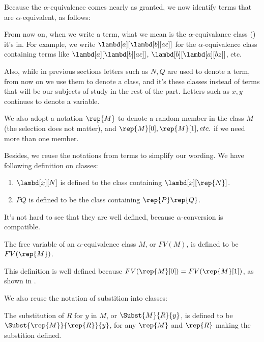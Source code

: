 \documentclass[../../../include/open-logic-section]{subfiles}
\begin{document}

Because the $\alpha$-equivalence comes nearly as granted, we now
identify terms that are $\alpha$-equivalent, as follows:

From now on, when we write a term, what we mean is the
$\alpha$-equivalance class () it's in. For
example, we write $\lambd[a][\lambd[b][a c]]$ for the
$\alpha$-equivalence class containing terms like
$\lambd[a][\lambd[b][a c]]$, $\lambd[b][\lambd[a][b z]]$, etc.

Also, while in previous sections letters such as $N, Q$ are used to
denote a term, from now on we use them to denote a class,
and it's these classes instead of terms that
will be our subjects of study in the rest of the part. Letters such as
$x, y$ continues to denote a variable.

We also adopt a notation $\rep{M}$ to denote a random member in the
class $M$ (the selection does not matter), and $\rep{M}[0], \rep{M}[1], etc. $ if we need more than
one member.

Besides, we reuse the notations from terms to simplify our wording. We
have following definition on classes:
\begin{defn}
  \begin{enumerate}
  \item $\lambd[x][N]$ is defined to the class containing
    $\lambd[x][\rep{N}]$.
  \item $PQ$ is defined to be the class containing $\rep{P}\rep{Q}$.
  \end{enumerate}
\end{defn}

It's not hard to see that they are well defined, because
$\alpha$-conversion is compatible.

\begin{defn} 
  The free variable of an $\alpha$-equivalence class $M$, or $FV(M)$, is defined to be $FV(\rep{M})$.
\end{defn}

This definition is well defined because $FV(\rep{M}[0]) = FV(\rep{M}[1])$, as shown in .

We also reuse the notation of substition into classes:
\begin{defn} 
  The substitution of $R$ for $y$ in $M$, or $\Subst{M}{R}{y}$, is
  defined to be $\Subst{\rep{M}}{\rep{R}}{y}$, for any $\rep{M}$ and
  $\rep{R}$ making the substition defined.
\end{defn}
\end{document}
